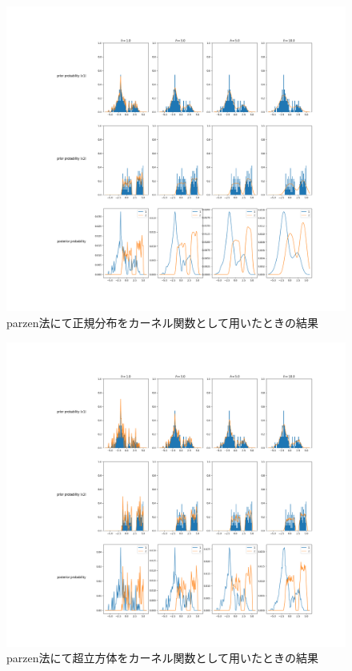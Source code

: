 \documentclass[class=jsarticle, crop=false, dvipdfmx, fleqn]{standalone}
\begin{document}
\begin{figure}
    \centering
    \includegraphics[clip, width=18cm, trim=200 72 0 0]{../figures/parzen_norm_result}
    \caption{parzen法にて正規分布をカーネル関数として用いたときの結果}
    \label{fig:parzen_norm_result}
\end{figure}

\begin{figure}
    \centering
    \includegraphics[clip, width=18cm, trim=200 72 0 0]{../figures/parzen_hypercube_result}
    \caption{parzen法にて超立方体をカーネル関数として用いたときの結果}
    \label{fig:parzen_hypercube_result}
\end{figure}
\end{document}
